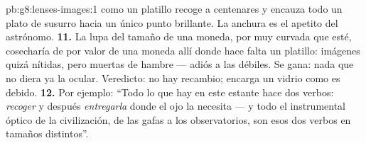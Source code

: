 \begin{solution}{pb:g8:lenses-images:1}
como un platillo recoge  a centenares y encauza todo
un plato de susurro hacia un único punto brillante. La anchura es el apetito del
astrónomo.
\textbf{11.} La lupa del tamaño de una moneda, por muy curvada que
esté, cosecharía  de  por valor de una moneda allí donde
hace falta un platillo: imágenes quizá nítidas, pero muertas de
hambre --- adiós a las  débiles. Se gana: nada que no
diera ya la  ocular. Veredicto: no hay recambio; encarga un
vidrio como es debido.
\textbf{12.} Por ejemplo: ``Todo lo que hay en este estante hace dos
verbos: \emph{recoger}  y después \emph{entregarla} donde el
ojo la necesita --- y todo el instrumental óptico de la civilización, de
las gafas a los observatorios, son esos dos verbos en tamaños
distintos''.
\end{solution}

